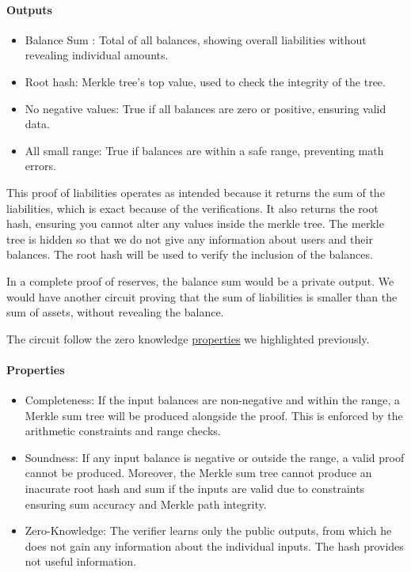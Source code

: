 \paragraph{Outputs}
\begin{itemize}
   \item Balance Sum : Total of all balances, showing overall liabilities without revealing individual amounts.
   \item Root hash: Merkle tree's top value, used to check the integrity of the tree.
   \item No negative values: True if all balances are zero or positive, ensuring valid data.
   \item All small range: True if balances are within a safe range, preventing math errors.
   \end{itemize}
   

This proof of liabilities operates as intended because it returns the sum of the liabilities, which is exact because of the verifications. %
It also returns the root hash, ensuring you cannot alter any values inside the merkle tree. The merkle tree is hidden so that we do not
give any information about users and their balances.
The root hash will be used to verify the inclusion of the balances.

In a complete proof of reserves, the balance sum would be a private output. We would have another circuit proving that the sum of liabilities is smaller
than the sum of assets, without revealing the balance.

The circuit follow the zero knowledge \hyperref[subsec:zkp]{properties} we highlighted previously. 
\paragraph{Properties}
\begin{itemize}
   \item Completeness: If the input balances are non-negative and within the range, a Merkle sum tree will be produced alongside the proof. This is enforced by the arithmetic constraints and range checks.
   \item Soundness: If any input balance is negative or outside the range, a valid proof cannot be produced. Moreover, the Merkle sum tree cannot produce an inacurate root hash and sum if the inputs are valid due to constraints ensuring sum accuracy and Merkle path integrity.
   \item Zero-Knowledge: The verifier learns only the public outputs, from which he does not gain any information about the individual inputs. The hash provides not useful information.
   \end{itemize}


